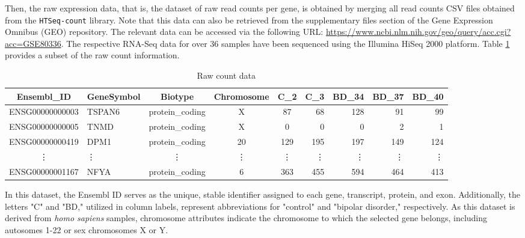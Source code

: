 Then, the raw expression data, that is, the dataset of raw read counts per gene, is obtained by merging all read counts CSV files obtained from the \texttt{HTSeq-count} library. Note that this data can also be retrieved from the supplementary files section of the Gene Expression Omnibus (GEO) repository. The relevant data can be accessed via the following URL: \url{https://www.ncbi.nlm.nih.gov/geo/query/acc.cgi?acc=GSE80336}. The respective RNA-Seq data for over 36 samples have been sequenced using the Illumina HiSeq 2000 platform. Table \ref{table:countdata_info} provides a subset of the raw count information.
\begin{table}[H]
\centering
\begin{tabular}{clcccrrrr}
\toprule
Ensembl\_ID & GeneSymbol & Biotype & Chromosome & C\_2 & C\_3 & BD\_34 & BD\_37 & BD\_40 \\
\midrule
ENSG00000000003 & TSPAN6 & protein\_coding & X & 87 & 68 & 128 & 91 & 99 \\
ENSG00000000005 & TNMD & protein\_coding & X & 0 & 0 & 0 & 2 & 1 \\
ENSG00000000419 & DPM1 & protein\_coding & 20 & 129 & 195 & 197 & 149 & 124 \\
\vdots & \vdots & \vdots & \vdots & \vdots & \vdots & \vdots & \vdots & \vdots \\
ENSG00000001167 & NFYA & protein\_coding & 6 & 363 & 455 & 594 & 464 & 413 \\
\bottomrule
\end{tabular}
\caption{Raw count data}
\label{table:countdata_info}
\end{table}
In this dataset, the Ensembl ID serves as the unique, stable identifier assigned to each gene, transcript, protein, and exon. Additionally, the letters "C" and "BD," utilized in column labels, represent abbreviations for "control" and "bipolar disorder," respectively. As this dataset is derived from \emph{homo sapiens} samples, chromosome attributes indicate the chromosome to which the selected gene belongs, including autosomes 1-22 or sex chromosomes X or Y.